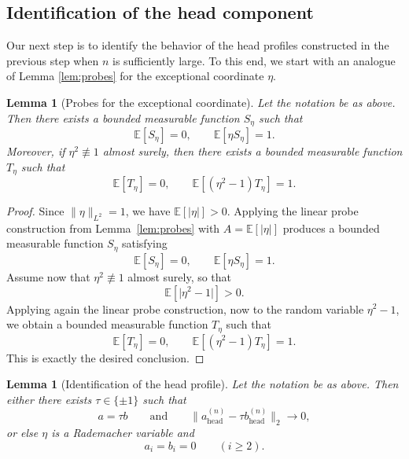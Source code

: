 \documentclass[11pt]{amsart}
\numberwithin{equation}{section}
\newtheorem{lemma}[theorem]{Lemma}
\theoremstyle{definition}
\theoremstyle{remark}
\newcommand{\E}{\mathbb E}
\newcommand{\abs}[1]{\lvert #1 \rvert}
\newcommand{\norm}[1]{\lVert #1 \rVert}
\begin{document}
\subsection{Identification of the head component} Our next step is to identify the  behavior of the head profiles constructed in the previous step when $n$ is sufficiently large. To this end, we start with an analogue of Lemma \ref{lem:probes} for the exceptional coordinate $\eta$.

\begin{lemma}[Probes for the exceptional coordinate]\label{prop:exceptional-probes}
Let the notation be as above. Then there exists a bounded measurable function $S_\eta$ such that
\[
\E[S_\eta]=0,
\qquad
\E[\eta S_\eta]=1.
\]
Moreover, if $\eta^2\not\equiv1$ almost surely, then there exists a bounded measurable
function $T_\eta$ such that
\[
\E[T_\eta]=0,
\qquad
\E[(\eta^2-1)T_\eta]=1.
\]
\end{lemma}

\begin{proof}
Since $\norm{\eta}_{L^2}=1$, we have $\E[\abs{\eta}]>0$.  Applying the linear probe construction from
Lemma~\ref{lem:probes} with $A=\E[\abs{\eta}]$ produces a bounded measurable
function $S_\eta$ satisfying
\[
\E[S_\eta]=0,
\qquad
\E[\eta S_\eta]=1.
\]
Assume now that $\eta^2\not\equiv1$ almost surely, so that
\[
\E[\abs{\eta^2-1}]>0.
\]
Applying again the linear probe construction, now to the random variable
$\eta^2-1$, we obtain a bounded measurable function $T_\eta$ such that
\[
\E[T_\eta]=0,
\qquad
\E[(\eta^2-1)T_\eta]=1.
\]
This is exactly the desired conclusion.
\end{proof}

\begin{lemma}[Identification of the head profile]\label{lem:head-sign}
Let the notation be as above. Then either there exists $\tau\in\{\pm1\}$ such that
\[
a=\tau b
\qquad\text{and}\qquad
\norm{a_{\mathrm{head}}^{(n)}-\tau b_{\mathrm{head}}^{(n)}}_2\to0,
\]
or else $\eta$ is a Rademacher variable and
\[
a_i=b_i=0
\qquad(i\ge2).
\]
\end{lemma}
\end{document}
